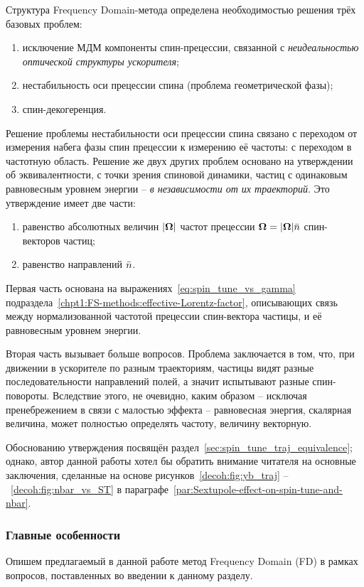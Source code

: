 Структура Frequency Domain-метода определена необходимостью решения трёх базовых проблем:
\begin{enumerate}[(1)]
	\item исключение МДМ компоненты спин-прецессии, связанной с
		\emph{неидеальностью оптической структуры ускорителя};
	\item нестабильность оси прецессии спина (проблема геометрической фазы);
	\item спин-декогеренция.
\end{enumerate}

Решение проблемы нестабильности оси прецессии спина связано с переходом от измерения набега фазы
спин прецессии к измерению её частоты: с переходом в частотную область. Решение же двух других 
проблем основано на утверждении об эквивалентности, с точки зрения спиновой динамики, частиц 
с одинаковым равновесным уровнем энергии -- \emph{в независимости от их траекторий}. 
Это утверждение имеет две части:
\begin{enumerate}[(1)]
	\item равенство абсолютных величин $|\boldsymbol{\Omega}|$ частот прецессии $\boldsymbol{\Omega} = |\boldsymbol{\Omega}|\bar n$
		 спин-векторов частиц;
	\item равенство направлений $\bar n$.
\end{enumerate}

Первая часть основана на выражениях~\eqref{eq:spin_tune_vs_gamma}
подраздела~\ref{chpt1:FS-methods:effective-Lorentz-factor}, описывающих связь между
нормализованной частотой прецессии спин-вектора частицы, и её равновесным уровнем энергии.

Вторая часть вызывает больше вопросов. Проблема заключается в том, что, при движении в
ускорителе по разным траекториям, частицы видят разные последовательности направлений полей,
а значит испытывают разные спин-повороты. Вследствие этого, не очевидно, каким образом -- исключая
пренебрежением в связи с малостью эффекта -- равновесная энергия, скалярная величина, может полностью
определять частоту, величину векторную. 

Обоснованию утверждения посвящён раздел~\ref{sec:spin_tune_traj_equivalence}; однако, автор данной работы 
хотел бы обратить внимание читателя на основные заключения, сделанные на основе
рисунков~\ref{decoh:fig:yb_traj} --~\ref{decoh:fig:nbar_vs_ST} в параграфе~\ref{par:Sextupole-effect-on-spin-tune-and-nbar}.

\subsubsection{Главные особенности}
Опишем предлагаемый в данной работе метод Frequency Domain (FD) в рамках вопросов, поставленных во введении
к данному разделу.

